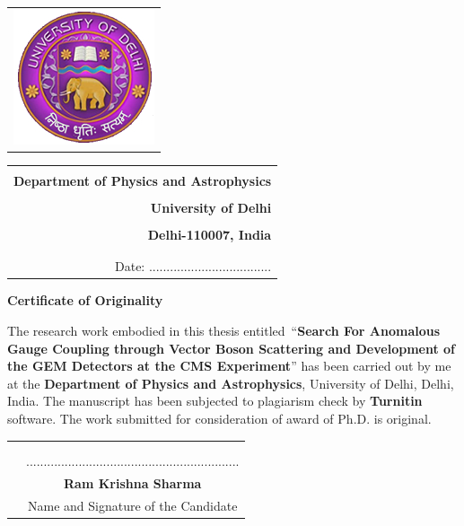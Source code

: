 \vspace{-1.5cm}

\begin{tabular}{l}
\includegraphics[scale=0.7]{figures/logo_du.jpg}
\end{tabular}
%
\hspace{3cm}
\begin{tabular}{r}
 \\
 \\
\color{blue} \textbf{Department of Physics  and Astrophysics} \\
 \\
\textbf{University of Delhi} \\
 \\
\textbf{Delhi-110007, India} \\
 \\
 \\
Date: ...................................  
\end{tabular}
%
\vspace{1cm}
\begin{center}
\textbf{\LARGE Certificate of Originality}
\end{center}
\vspace{0.5cm}
%
The research work embodied in this thesis entitled~``\textbf{Search For Anomalous Gauge Coupling through Vector Boson Scattering and Development of the GEM Detectors at the CMS Experiment}'' has been carried out by me at the \textbf{Department of Physics and Astrophysics}, University of Delhi, Delhi, India. The manuscript has been subjected to plagiarism check by \textbf{Turnitin} software. The work submitted for consideration of award of Ph.D. is original. \\
\begin{tabular}{cc}
 & \\
 & \\
 & \hspace{9cm} ............................................................. \\
 & \hspace{9cm} \textbf{Ram Krishna Sharma} \\
 & \hspace{8.5cm} Name and Signature of the Candidate
\end{tabular}